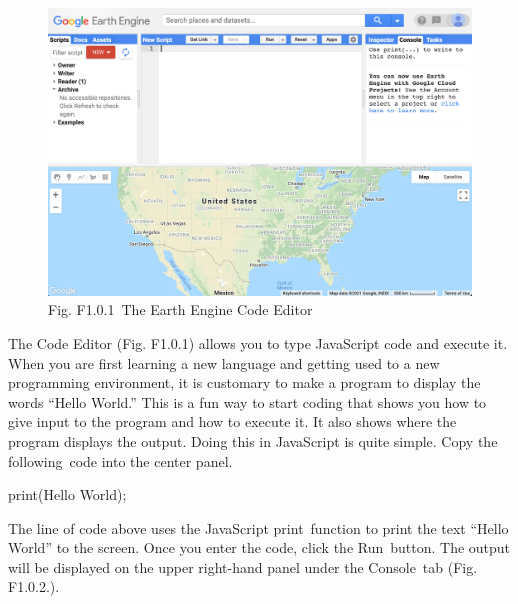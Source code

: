 \documentclass[
  letterpaper,
  DIV=11,
  numbers=noendperiod]{scrreprt}
\newenvironment{Shaded}{\begin{snugshade}}{\end{snugshade}}
\newcommand{\FunctionTok}[1]{\textcolor[rgb]{0.28,0.35,0.67}{#1}}
\newcommand{\NormalTok}[1]{\textcolor[rgb]{0.00,0.23,0.31}{#1}}
\newcommand{\OperatorTok}[1]{\textcolor[rgb]{0.37,0.37,0.37}{#1}}
\newcommand{\StringTok}[1]{\textcolor[rgb]{0.13,0.47,0.30}{#1}}
\begin{document}
\begin{figure}

{\centering \includegraphics{./F1/image41.png}

}

\caption{Fig. F1.0.1~The Earth Engine Code Editor}

\end{figure}

The Code Editor (Fig. F1.0.1) allows you to type JavaScript code and
execute it. When you are first learning a new language and getting used
to a new programming environment, it is customary to make a program to
display the words ``Hello World.'' This is a fun way to start coding
that shows you how to give input to the program and how to execute it.
It also shows where the program displays the output. Doing this in
JavaScript is quite simple. Copy the following~code into the center
panel.

\begin{Shaded}
\begin{Highlighting}[]
\FunctionTok{print}\NormalTok{(}\StringTok{\textquotesingle{}Hello World\textquotesingle{}}\NormalTok{)}\OperatorTok{;}
\end{Highlighting}
\end{Shaded}

The line of code above uses the JavaScript print~function to print the
text ``Hello World'' to the screen. Once you enter the code, click the
Run~button. The output will be displayed on the upper right-hand panel
under the Console~tab (Fig. F1.0.2.).
\end{document}
